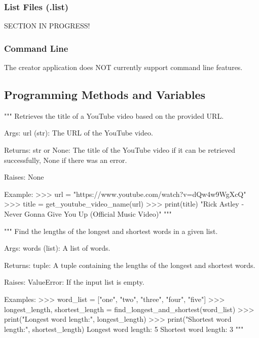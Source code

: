 \subsubsection{List Files (.list) \label{section .list}}

SECTION IN PROGRESS!













\subsubsection{Command Line}

The creator application does NOT currently support command line features.

\subsection{Programming Methods and Variables}

\begin{codebox}
"""
Retrieves the title of a YouTube video based on the provided URL.

Args:
    url (str): The URL of the YouTube video.

Returns:
    str or None: The title of the YouTube video if it can be retrieved successfully,
                 None if there was an error.

Raises:
    None

Example:
    >>> url = "https://www.youtube.com/watch?v=dQw4w9WgXcQ"
    >>> title = get_youtube_video_name(url)
    >>> print(title)
    "Rick Astley - Never Gonna Give You Up (Official Music Video)"
"""
\end{codebox}

\begin{codebox}
"""
Find the lengths of the longest and shortest words in a given list.

Args:
    words (list): A list of words.

Returns:
    tuple: A tuple containing the lengths of the longest and shortest words.

Raises:
    ValueError: If the input list is empty.

Examples:
    >>> word_list = ["one", "two", "three", "four", "five"]
    >>> longest_length, shortest_length = find_longest_and_shortest(word_list)
    >>> print("Longest word length:", longest_length)
    >>> print("Shortest word length:", shortest_length)
    Longest word length: 5
    Shortest word length: 3
"""
\end{codebox}

